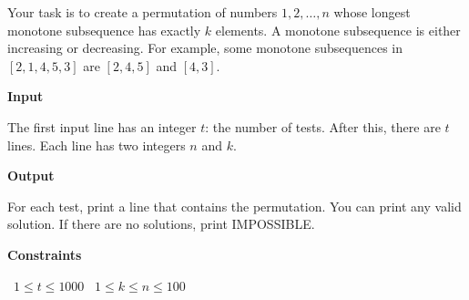 Your task is to create a permutation of numbers $1,2,\dots,n$ whose longest monotone subsequence has exactly $k$ elements.
A monotone subsequence is either increasing or decreasing. For example, some monotone subsequences in $[2,1,4,5,3]$ are $[2,4,5]$ and $[4,3]$.

\vspace{0.3cm}\noindent\textbf{Input}

The first input line has an integer $t$: the number of tests.
After this, there are $t$ lines. Each line has two integers $n$ and $k$.

\vspace{0.3cm}\noindent\textbf{Output}

For each test, print a line that contains the permutation. You can print any valid solution. If there are no solutions, print IMPOSSIBLE.

\vspace{0.3cm}\noindent\textbf{Constraints}

\textbullet\ $1 \le t \le 1000$
\textbullet\ $1 \le k \le n \le 100$